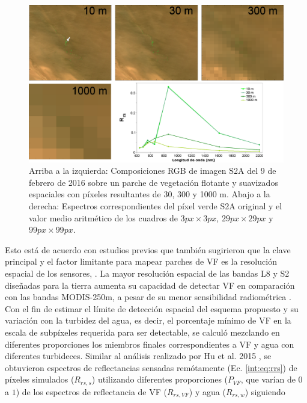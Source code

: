         \begin{figure}
        \centering
        \includegraphics[width=\textwidth]{cam/figures/FAIT_RES.png}
        \caption[Composiciones RGB de imagen S2A sobre un parche de vegetación flotante y efecto de diferentes niveles de degradación espacial.]{Arriba a la izquierda: Composiciones RGB de imagen S2A del 9 de febrero de 2016 sobre un parche de vegetación flotante y suavizados espaciales con píxeles resultantes de 30, 300 y 1000 m. Abajo a la derecha: Espectros correspondientes del píxel verde S2A original y el valor medio aritmético de los cuadros de $3 px \times 3 px$, $29 px \times 29 px$ y $99 px \times 99 px$.}
        \label{cam:FAIT_RES}
        \end{figure}

        Esto está de acuerdo con estudios previos que también sugirieron que la clave principal y el factor limitante para mapear parches de VF es la resolución espacial de los sensores, \cite{hu2009}\cite{cui2012}\cite{xu2015}. La mayor resolución espacial de las bandas L8 y S2 diseñadas para la tierra aumenta su capacidad de detectar VF en comparación con las bandas MODIS-250m, a pesar de su menor sensibilidad radiométrica \cite{hu2009}. Con el fin de estimar el límite de detección espacial del esquema propuesto y su variación con la turbidez del agua, es decir, el porcentaje mínimo de VF en la escala de subpíxeles requerida para ser detectable, se calculó mezclando en diferentes proporciones los miembros finales correspondientes a VF y agua con diferentes turbideces. Similar al análisis realizado por Hu et al. 2015 \cite{hu2015}, se obtuvieron espectros de reflectancias sensadas remótamente (Ec. \ref{int:eq:rrs}) de píxeles simulados ($R_{rs,s}$) utilizando diferentes proporciones ($P_{VF}$, que varían de $0$ a $1$) de los espectros de reflectancia de VF ($R_{rs,VF}$) y agua ($R_{rs,w}$) siguiendo

